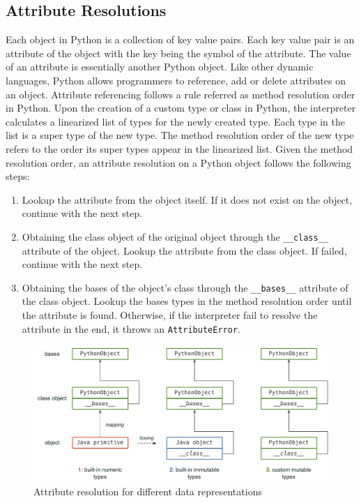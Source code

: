 \subsection{Attribute Resolutions}
\label{sec:ch5-attribute-resolution}

Each object in Python is a collection of key value pairs.
Each key value pair is an attribute of the object with the key being the symbol of the attribute.
The value of an attribute is essentially another Python object.
Like other dynamic languages, Python allows programmers to reference, add or delete attributes on an object.
Attribute referencing follows a rule referred as method resolution order in Python.
Upon the creation of a custom type or class in Python, the interpreter calculates a linearized list of types for the newly created type.
Each type in the list is a super type of the new type.
The method resolution order of the new type refers to the order its super types appear in the linearized list.
Given the method resolution order, an attribute resolution on a Python object follows the following steps:

\begin{enumerate}

\item Lookup the attribute from the object itself.
If it does not exist on the object, continue with the next step.

\item Obtaining the class object of the original object through the \texttt{\_\_class\_\_} attribute of the object.
Lookup the attribute from the class object.
If failed, continue with the next step.

\item Obtaining the bases of the object's class through the \texttt{\_\_bases\_\_} attribute of the class object.
Lookup the bases types in the method resolution order until the attribute is found.
Otherwise, if the interpreter fail to resolve the attribute in the end, it throws an \texttt{AttributeError}.

\end{enumerate}

\begin{figure}
\centering
\includegraphics[scale=.54]{figures/ch5-attribute-resolutions}
\caption{Attribute resolution for different data representations}
\label{fig:ch5-attribute-resolutions}
\end{figure}


